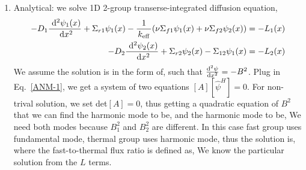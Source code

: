 \documentclass{school-22.211-notes}
\begin{document}
\begin{enumerate}
\begin{enumerate}
    \item Analytical: we solve 1D 2-group transerse-integrated diffusion equation, 
      \begin{align}
      -D_1 \frac{\mbox{ }\mathrm{d}^2 \psi_1(x)}{\mbox{ }\mathrm{d} x^2} + \Sigma_{r1} \psi_1(x) - \frac{1}{\left. k_{\mathrm{eff}} \right.} (\nu \Sigma_{f1} \psi_1 (x) + \nu \Sigma_{f2} \psi_2 (x) ) &= - L_1(x) \notag \\
      -D_2 \frac{\mbox{ }\mathrm{d}^2 \psi_2(x)}{\mbox{ }\mathrm{d} x^2} + \Sigma_{r2} \psi_2(x) - \Sigma_{12} \psi_1 (x) &= - L_2 (x)  \label{ANM-1}
    \end{align}
      We assume the solution is in the form of, 
      such that $\frac{\mathrm{d}^{2}\psi}{\mathrm{d}x^{2}} = - B^2$. Plug in Eq.~\ref{ANM-1}, we get a system of two equations $[A] [\hat{\psi}^H] = 0$. For non-trival solution, we set det$[A] = 0$, thus getting a quadratic equation of $B^2$ that we can find the harmonic mode to be, 
      and the harmonic mode to be, 
      We need both modes because $B_1^2$ and $B_2^2$ are different. In this case fast group uses fundamental mode, thermal group uses harmonic mode, thus the solution is, 
     where the fast-to-thermal flux ratio is defined as,
     We know the particular solution from the $L$ terms. 


\end{enumerate}
\end{enumerate}
\end{document}
